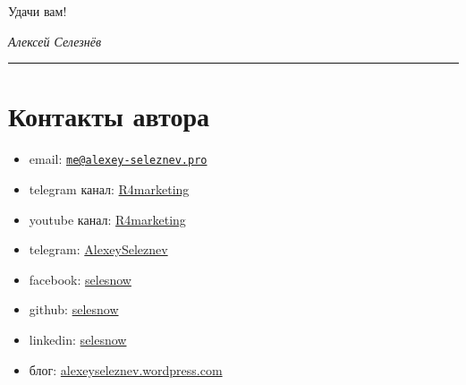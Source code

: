 \documentclass[
]{book}
\providecommand{\tightlist}{%
  \setlength{\itemsep}{0pt}\setlength{\parskip}{0pt}}
\begin{document}
Удачи вам!

\emph{Алексей Селезнёв}

\begin{center}\rule{0.5\linewidth}{0.5pt}\end{center}

\hypertarget{ux43aux43eux43dux442ux430ux43aux442ux44b-ux430ux432ux442ux43eux440ux430}{%
\section*{Контакты автора}\label{ux43aux43eux43dux442ux430ux43aux442ux44b-ux430ux432ux442ux43eux440ux430}}

\begin{itemize}
\tightlist
\item
  email: \href{mailto:me@alexey-seleznev.pro}{\nolinkurl{me@alexey-seleznev.pro}}
\item
  telegram канал: \href{https://t.me/R4marketing}{R4marketing}
\item
  youtube канал: \href{https://www.youtube.com/R4marketing/?sub_confirmation=1}{R4marketing}
\item
  telegram: \href{https://t.me/AlexeySeleznev}{AlexeySeleznev}
\item
  facebook: \href{https://facebook.com/selesnow}{selesnow}
\item
  github: \href{https://github.com/selesnow/}{selesnow}
\item
  linkedin: \href{linkedin.com/in/selesnow}{selesnow}
\item
  блог: \href{https://alexeyseleznev.wordpress.com/}{alexeyseleznev.wordpress.com}
\end{itemize}

  
\end{document}
